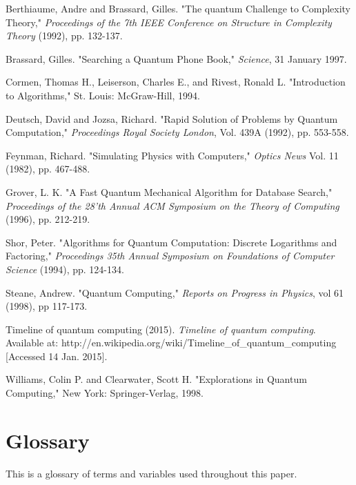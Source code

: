 \documentclass[]{article}
\begin{document}
Berthiaume, Andre and Brassard, Gilles. "The quantum Challenge to
Complexity Theory," \emph{Proceedings of the 7th IEEE Conference on
Structure in Complexity Theory} (1992), pp. 132-137.

Brassard, Gilles. "Searching a Quantum Phone Book," \emph{Science}, 31
January 1997.

Cormen, Thomas H., Leiserson, Charles E., and Rivest, Ronald L.
"Introduction to Algorithms," St. Louis: McGraw-Hill, 1994.

Deutsch, David and Jozsa, Richard. "Rapid Solution of Problems by
Quantum Computation," \emph{Proceedings Royal Society London}, Vol. 439A
(1992), pp. 553-558.

Feynman, Richard. "Simulating Physics with Computers," \emph{Optics News}
Vol. 11 (1982), pp. 467-488.

Grover, L. K. "A Fast Quantum Mechanical Algorithm for Database
Search," \emph{Proceedings of the 28'th Annual ACM Symposium on the Theory
of Computing} (1996), pp. 212-219.

Shor, Peter. "Algorithms for Quantum Computation: Discrete Logarithms
and Factoring," \emph{Proceedings 35th Annual Symposium on Foundations of
Computer Science} (1994), pp. 124-134.

Steane, Andrew. "Quantum Computing," \emph{Reports on Progress in Physics},
vol 61 (1998), pp 117-173.

Timeline of quantum computing (2015). \emph{Timeline of quantum computing}. Available at:
http://en.wikipedia.org/wiki/Timeline\_of\_quantum\_computing
[Accessed 14 Jan. 2015].

Williams, Colin P. and Clearwater, Scott H. "Explorations in Quantum
Computing," New York: Springer-Verlag, 1998.

\section{Glossary}

This is a glossary of terms and variables used throughout this paper.
\end{document}
